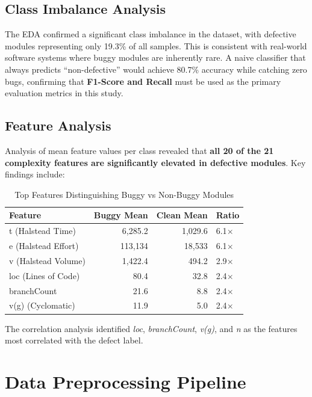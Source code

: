 \documentclass[12pt,a4paper]{article}
\begin{document}
\subsection{Class Imbalance Analysis}

The EDA confirmed a significant class imbalance in the dataset, with
defective modules representing only 19.3\% of all samples. This is
consistent with real-world software systems where buggy modules are
inherently rare. A naive classifier that always predicts ``non-defective''
would achieve 80.7\% accuracy while catching zero bugs, confirming
that \textbf{F1-Score and Recall} must be used as the primary evaluation
metrics in this study.

\subsection{Feature Analysis}

Analysis of mean feature values per class revealed that \textbf{all 20 of the
21 complexity features are significantly elevated in defective modules}.
Key findings include:

\begin{table}[H]
  \centering
  \caption{Top Features Distinguishing Buggy vs Non-Buggy Modules}
  \begin{tabular}{lrrl}
    \toprule
    \textbf{Feature} & \textbf{Buggy Mean} & \textbf{Clean Mean} & \textbf{Ratio} \\
    \midrule
    t (Halstead Time)      & 6,285.2  & 1,029.6 & 6.1$\times$ \\
    e (Halstead Effort)    & 113,134  & 18,533  & 6.1$\times$ \\
    v (Halstead Volume)    & 1,422.4  & 494.2   & 2.9$\times$ \\
    loc (Lines of Code)    & 80.4     & 32.8    & 2.4$\times$ \\
    branchCount            & 21.6     & 8.8     & 2.4$\times$ \\
    v(g) (Cyclomatic)      & 11.9     & 5.0     & 2.4$\times$ \\
    \bottomrule
  \end{tabular}
\end{table}

The correlation analysis identified \textit{loc}, \textit{branchCount},
\textit{v(g)}, and \textit{n} as the features most correlated with the
defect label.

\section{Data Preprocessing Pipeline}
\end{document}
